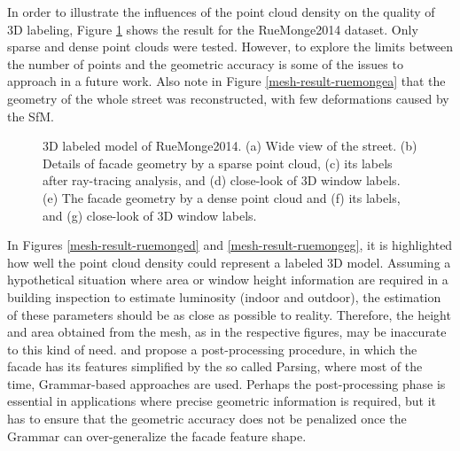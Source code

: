 In order to illustrate the influences of the point cloud density on the quality of 3D labeling, Figure \ref{mesh-result-ruemonge} shows the result for the RueMonge2014 dataset. Only sparse and dense point clouds were tested. However, to explore the limits between the number of points and the geometric accuracy is some of the issues to approach in a future work. Also note in Figure \ref{mesh-result-ruemongea} that the geometry of the whole street was reconstructed, with few deformations caused by the SfM.
\begin{figure}[!htp]
    \centering   
    \caption{3D labeled model of RueMonge2014. (a) Wide view of the street. (b) Details of facade geometry by a sparse point cloud, (c) its labels after ray-tracing analysis, and (d) close-look of 3D window labels. (e) The facade geometry by a dense point cloud and (f) its labels, and (g) close-look of 3D window labels.}
    \vspace{6mm}    
    \vspace{2mm}
    \legenda{}
    \label{mesh-result-ruemonge}
\end{figure}

In Figures \ref{mesh-result-ruemonged} and \ref{mesh-result-ruemongeg}, it is highlighted how well the point cloud density could represent a labeled 3D model. Assuming a hypothetical situation where area or window height information are required in a building inspection to estimate luminosity (indoor and outdoor), the estimation of these parameters should be as close as possible to reality. Therefore, the height and area obtained from the mesh, as in the respective figures, may be inaccurate to this kind of need.  and  propose a post-processing procedure, in which the facade has its features simplified by the so called Parsing, where most of the time, Grammar-based approaches \cite{stiny1971} are used. Perhaps the post-processing phase is essential in applications where precise geometric information is required, but it has to ensure that the geometric accuracy does not be penalized once the Grammar can over-generalize the facade feature shape.

